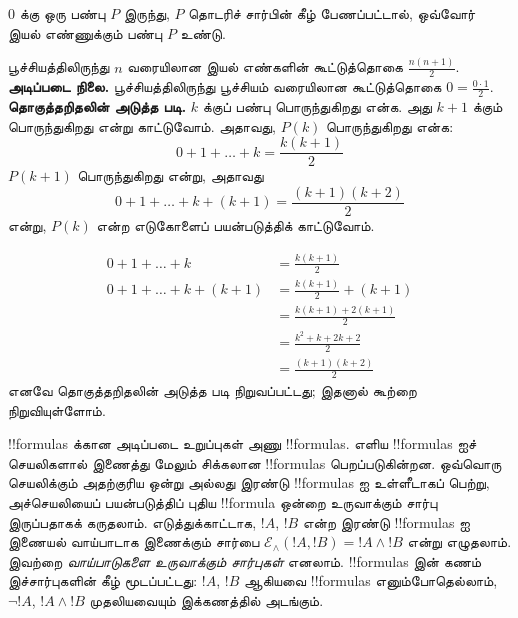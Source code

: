 \documentclass[../../../include/open-logic-section]{subfiles}
\begin{document}
\begin{defn}[$\Nat$ மீது தொகுத்தறிதல்]
0 க்கு ஒரு பண்பு $P$ இருந்து, $P$ தொடரிச் சார்பின் கீழ்
பேணப்பட்டால், ஒவ்வோர் இயல் எண்ணுக்கும் பண்பு $P$ உண்டு.
\end{defn}

\begin{ex}
பூச்சியத்திலிருந்து $n$ வரையிலான இயல் எண்களின் கூட்டுத்தொகை
$\frac{n(n+1)}{2}$. \\

\textbf{அடிப்படை நிலை.} பூச்சியத்திலிருந்து பூச்சியம் வரையிலான கூட்டுத்தொகை
$0=\frac{0\cdot 1}{2}$.\\

\textbf{தொகுத்தறிதலின் அடுத்த படி.} $k$ க்குப் பண்பு
பொருந்துகிறது என்க. அது $k+1$ க்கும் பொருந்துகிறது என்று
காட்டுவோம். அதாவது, $P(k)$ பொருந்துகிறது என்க:
\[ 0 + 1 + \ldots + k = \frac{k(k+1)}{2} \]
$P(k+1)$ பொருந்துகிறது என்று, அதாவது
\[ 0 + 1 + \ldots + k + (k+1) = \frac{(k+1)(k+2)}{2} \]
என்று, $P(k)$ என்ற எடுகோளைப் பயன்படுத்திக் காட்டுவோம்.

\begin{align*}
0 + 1 + \ldots + k &= \frac{k(k+1)}{2} \tag{எடுகோள்} \\
0 + 1 + \ldots + k + (k+1) &= \frac{k(k+1)}{2} + (k+1)
\tag{இரு பக்கங்களிலும் $k+1$ ஐச் சேர்க்க} \\
&= \frac{k(k+1) + 2(k+1)}{2} \\
&= \frac{k^2 + k + 2k +2}{2} \\
&=\frac{(k+1)(k+2)}{2}
\end{align*}
எனவே தொகுத்தறிதலின் அடுத்த படி நிறுவப்பட்டது;
இதனால் கூற்றை நிறுவியுள்ளோம்.
\end{ex}

\begin{explain}
!!{formula}s க்கான அடிப்படை உறுப்புகள் அணு !!{formula}s.
எளிய !!{formula}s ஐச் செயலிகளால் இணைத்து மேலும் சிக்கலான
!!{formula}s பெறப்படுகின்றன. ஒவ்வொரு செயலிக்கும் அதற்குரிய
ஒன்று அல்லது இரண்டு !!{formula}s ஐ உள்ளீடாகப் பெற்று,
அச்செயலியைப் பயன்படுத்திப் புதிய !!{formula} ஒன்றை உருவாக்கும்
சார்பு இருப்பதாகக் கருதலாம். எடுத்துக்காட்டாக,
$!A$, $!B$ என்ற இரண்டு !!{formula}s ஐ இணையல் வாய்பாடாக
இணைக்கும் சார்பை $\mathcal E _\land (!A,
!B) = !A \land !B$ என்று எழுதலாம். இவற்றை
\emph{வாய்பாடுகளை உருவாக்கும் சார்புகள்} எனலாம்.
!!{formula}s இன் கணம் இச்சார்புகளின் கீழ் மூடப்பட்டது:
$!A$, $!B$ ஆகியவை !!{formula}s எனும்போதெல்லாம்,
$\lnot !A$, $!A \land !B$ முதலியவையும் இக்கணத்தில் அடங்கும்.
\end{explain}
\end{document}
